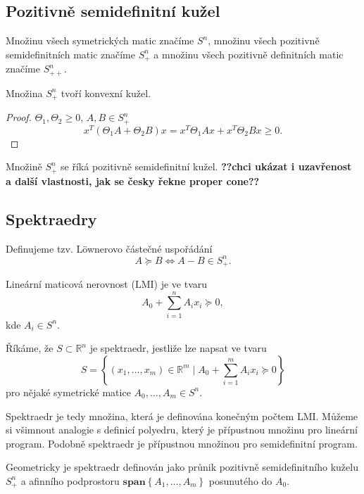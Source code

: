 \subsection*{Pozitivně semidefinitní kužel}

Množinu všech symetrických matic značíme $S^n$, množinu všech pozitivně semidefinitních matic značíme $S_+^n$ a množinu všech pozitivně definitních matic značíme $S_{++}^n$. 

\begin{vt}
    Množina $S_+^n$ tvoří konvexní kužel.
\end{vt}

\begin{proof}
    $\Theta_1, \Theta_2 \geq 0$, $A, B \in S_+^n$
    $$
        x^T \left( \Theta_1 A + \Theta_2 B \right) x = x^T \Theta_1 A x + x^T \Theta_2 B x \geq 0.
    $$
\end{proof}

Množině $S_+^n$ se říká pozitivně semidefinitní kužel. \textbf{??chci ukázat i uzavřenost a další vlastnosti, jak se česky řekne proper cone??}

\subsection*{Spektraedry}

Definujeme tzv. L\"{o}wnerovo částečné uspořádání
$$
    A \succeq B \iff A - B \in S_+^n.
$$

\begin{df}
    Lineární maticová nerovnost (LMI) je ve tvaru
    $$
        A_0 + \sum_{i=1}^n A_i x_i \succeq 0,
    $$
    kde $A_i \in S^n$.
\end{df}

\begin{df}
    Říkáme, že $S \subset \mathbb{R}^n$ je spektraedr, jestliže lze napsat ve tvaru
    $$
        S = \left\{ (x_1, \dots, x_m) \in \mathbb{R}^m \mid A_0 + \sum_{i=1}^m A_i x_i \succeq 0 \right\}
    $$
    pro nějaké symetrické matice $A_0, \dots, A_m \in S^n$.
\end{df}

Spektraedr je tedy množina, která je definována konečným počtem LMI. Můžeme si všimnout analogie s definicí polyedru, který je přípustnou množinu pro lineární program. Podobně spektraedr je přípustnou množinou pro semidefinitní program.

Geometricky je spektraedr definován jako průnik pozitivně semidefinitního kuželu $S_+^n$ a afinního podprostoru $\textbf{span}\left\{ A_1, \dots, A_m \right\}$ posunutého do $A_0$.


